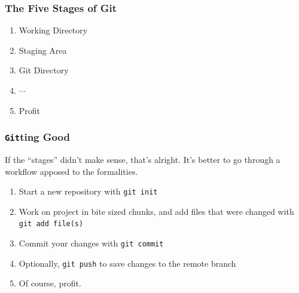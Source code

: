 \documentclass{beamer}
\newcounter{committing}
\newcommand{\shellcmd}[1]{\texttt{\colorbox{gray!30}{#1}}}
\begin{document}
\begin{frame}
    \frametitle{The Five Stages of Git}

    \begin{enumerate}
        \item Working Directory %
        \item Staging Area %
        \item Git Directory %
        \item $\cdots$
        \item Profit %
    \end{enumerate}
\end{frame}

\begin{frame}
    \frametitle{\shellcmd{Git}ting Good}

    If the ``stages'' didn't make sense, that's alright. It's better to go through a workflow apposed to the formalities.

    \begin{enumerate}
        \item Start a new repository with \shellcmd{git init} %
        \item Work on project in bite sized chunks, and add files that were changed with \shellcmd{git add file(s)} %
        \item Commit your changes with \shellcmd{git commit} %
        \item Optionally, \shellcmd{git push} to save changes to the remote branch
        \item Of course, profit.
    \end{enumerate}
\end{frame}
\end{document}
